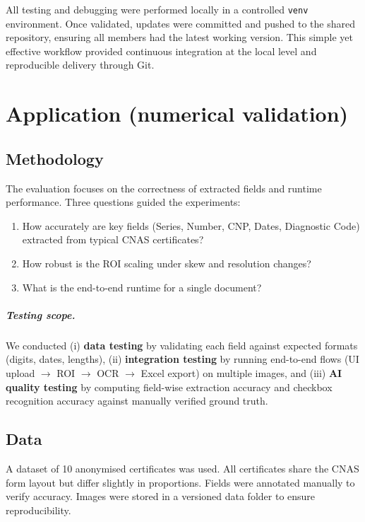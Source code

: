 \documentclass[runningheads,a4paper,11pt]{report}
\begin{document}
All testing and debugging were performed locally in a controlled \texttt{venv} environment.  
Once validated, updates were committed and pushed to the shared repository, ensuring all members had the latest working version.  
This simple yet effective workflow provided continuous integration at the local level and reproducible delivery through Git.




\chapter{Application (numerical validation)}
\label{chapter:application}

\section{Methodology}
The evaluation focuses on the correctness of extracted fields and runtime performance.  
Three questions guided the experiments:
\begin{enumerate}
  \item How accurately are key fields (Series, Number, CNP, Dates, Diagnostic Code) extracted from typical CNAS certificates?
  \item How robust is the ROI scaling under skew and resolution changes?
  \item What is the end-to-end runtime for a single document?
\end{enumerate}

\paragraph{Testing scope.}
We conducted (i) \textbf{data testing} by validating each field against expected formats (digits, dates, lengths), 
(ii) \textbf{integration testing} by running end-to-end flows (UI upload $\rightarrow$ ROI $\rightarrow$ OCR $\rightarrow$ Excel export) on multiple images, 
and (iii) \textbf{AI quality testing} by computing field-wise extraction accuracy and checkbox recognition accuracy against manually verified ground truth.

\section{Data}
A dataset of 10 anonymised certificates was used.
All certificates share the CNAS form layout but differ slightly in proportions.  
Fields were annotated manually to verify accuracy.  
Images were stored in a versioned data folder to ensure reproducibility.
\end{document}
